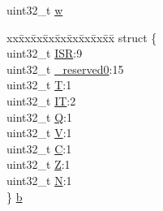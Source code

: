 \begin{DoxyCompactItemize}
\begin{tabbing}
\end{tabbing}\item 
uint32\+\_\+t \mbox{\hyperlink{unionx_p_s_r___type_ad0fb62e7a08e70fc5e0a76b67809f84b}{w}}
\item 
\begin{tabbing}
xx\=xx\=xx\=xx\=xx\=xx\=xx\=xx\=xx\=\kill
struct \{\\
\>uint32\_t \mbox{\hyperlink{unionx_p_s_r___type_ad502ba7dbb2aab5f87c782b28f02622d}{ISR}}:9\\
\>uint32\_t \mbox{\hyperlink{unionx_p_s_r___type_ac8a6a13838a897c8d0b8bc991bbaf7c1}{\_reserved0}}:15\\
\>uint32\_t \mbox{\hyperlink{unionx_p_s_r___type_a6e1cf12e53a20224f6f62c001d9be972}{T}}:1\\
\>uint32\_t \mbox{\hyperlink{unionx_p_s_r___type_a76485660fe8ad98cdc71ddd7cb0ed777}{IT}}:2\\
\>uint32\_t \mbox{\hyperlink{unionx_p_s_r___type_a65f27ddc4f7e09c14ce7c5211b2e000a}{Q}}:1\\
\>uint32\_t \mbox{\hyperlink{unionx_p_s_r___type_acd4a2b64faee91e4a9eef300667fa222}{V}}:1\\
\>uint32\_t \mbox{\hyperlink{unionx_p_s_r___type_a7a1caf92f32fe9ebd8d1fe89b06c7776}{C}}:1\\
\>uint32\_t \mbox{\hyperlink{unionx_p_s_r___type_a5ae954cbd9986cd64625d7fa00943c8e}{Z}}:1\\
\>uint32\_t \mbox{\hyperlink{unionx_p_s_r___type_abae0610bc2a97bbf7f689e953e0b451f}{N}}:1\\
\} \mbox{\hyperlink{unionx_p_s_r___type_a5fe7b3d4251f5516a5cc744f416a600a}{b}}\\


\end{tabbing}
\end{DoxyCompactItemize}
